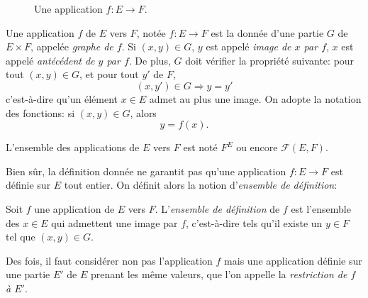 \documentclass[twoside,11pt]{article}
\theoremstyle{definition}
\theoremstyle{remark}
\theoremstyle{theorem}
\begin{document}
\begin{figure}
	\centering
{}
\caption{Une application $f\colon E\longrightarrow F$.}
\end{figure}


\begin{defn}
	Une application $f$ de $E$ vers $F$, notée $f:E\longrightarrow F$ est la donnée d'une partie $G$ de $E\times F$, appelée \textit{graphe de $f$}. Si $(x,y)\in G$, $y$ est appelé \textit{image de $x$ par $f$}, $x$ est appelé \textit{antécédent de $y$ par $f$}. De plus, $G$ doit vérifier la propriété suivante:
	pour tout $(x,y)\in G$, et pour tout $y'$ de $F$,
	\[
	(x,y')\in G \Rightarrow y=y'
	\]
	c'est-à-dire qu'un élément $x\in E$ admet au plus une image. On adopte la notation des fonctions: si $(x,y)\in G$, alors
	\[y=f(x).\]
	
	L'ensemble des applications de $E$ vers $F$ est noté $F^E$ ou encore \(\mathcal{F}(E,F)\).
\end{defn}


Bien sûr, la définition donnée ne garantit pas qu'une application $f\colon E\longrightarrow F$ est définie sur $E$ tout entier. On définit alors la notion d'\textit{ensemble de définition}:

\begin{defn}
	Soit $f$ une application de $E$ vers $F$. L'\textit{ensemble de définition} de $f$ est l'ensemble des $x\in E$ qui admettent une image par $f$, c'est-à-dire tels qu'il existe un $y\in F$ tel que $(x,y)\in G$.
\end{defn}

Des fois, il faut considérer non pas l'application $f$ mais une application définie sur une partie $E'$ de $E$ prenant les même valeurs, que l'on appelle la \textit{restriction de $f$ à $E'$}.
\end{document}
